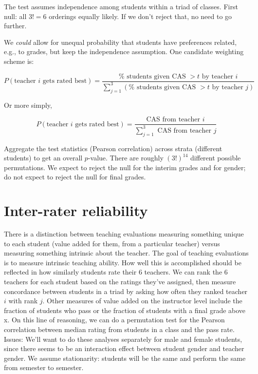 \documentclass[12pt]{article}
\begin{document}
The test assumes independence among students within a triad of classes.
First null: all $3! = 6$ orderings equally likely.
If we don't reject that, no need to go further.

We \emph{could} allow for unequal probability that students have preferences
related, e.g., to grades, but keep the independence assumption.
One candidate weighting scheme is:

$$P(\text{teacher $i$ gets rated best}) = \frac{\%\text{ students given CAS }> t\text{ by teacher $i$}}{\sum_{j=1}^3(\%\text{ students given CAS }> t\text{ by teacher }j)}$$
 
Or more simply, 

   $$P(\text{teacher $i$ gets rated best}) = 
   \frac{\text{CAS from teacher $i$}}{\sum_{j=1}^3\text{ CAS from teacher }j}
   $$
   
Aggregate the test statistics (Pearson correlation) across strata (different students) to get an overall $p$-value.  
There are roughly $(3!)^{14}$ different possible permutations.
We expect to reject the null for the interim grades and for gender; 
do not expect to reject the null for final grades.


\section{Inter-rater reliability}
There is a distinction between teaching evaluations measuring something unique to each student 
(value added for them, from a particular teacher) versus 
measuring something intrinsic about the teacher.  
The goal of teaching evaluations is to measure intrinsic teaching ability.  
How well this is accomplished should be reflected in how similarly 
students rate their 6 teachers.
We can rank the 6 teachers for each student based on the ratings 
they've assigned, then measure concordance between students in a triad by asking how often they ranked teacher $i$ with rank $j$.
Other measures of value added on the instructor level include the fraction of 
students who pass or the fraction of students with a final grade above x.  
On this line of reasoning, we can do a permutation test for the 
Pearson correlation between median rating from students in a class and the pass rate.
Issues:
We'll want to do these analyses separately for male and female students, 
since there seems to be an interaction effect between student gender and teacher gender.
We assume stationarity: students will be the same and perform the same from semester to semester.
\end{document}
